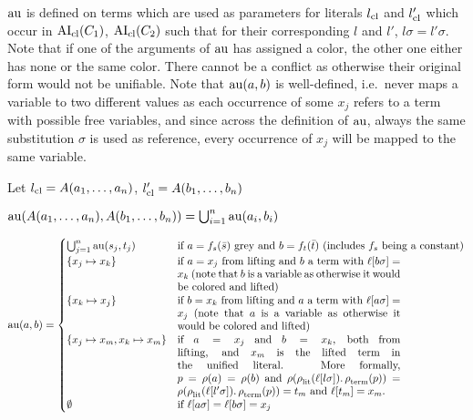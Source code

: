 \documentclass[,%
	paper=a4,%
	twoside=false,%
	liststotoc,
	bibtotoc,
	draft=false,%
	numbers=noendperiod
]{scrartcl}
\begin{document}
\begin{enumerate}
		$\operatorname{au}$ is defined on terms which are used as parameters for literals $l_\mathrm{cl}$ and $l_\mathrm{cl}'$
		which occur in $\operatorname{AI}_\mathrm{cl}(C_1)$, $\operatorname{AI}_\mathrm{cl}(C_2)$ such that for their corresponding $l$ and $l'$, $l\sigma = l'\sigma$.
		Note that if one of the arguments of $\operatorname{au}$ has assigned a color, the other one either has none or the same color.
		There cannot be a conflict as otherwise their original form would not be unifiable.
		Note that $\operatorname{au}(a, b)$ is well-defined, i.e.~never maps a variable to two different values as each occurrence of some $x_j$ refers to a term with possible free variables, and since across the definition of $\operatorname{au}$, always the same substitution $\sigma$ is used as reference, every occurrence of $x_j$ will be mapped to the same variable.

		Let 
		$l_\mathrm{cl} = A(a_1, \dotsc, a_n)$, $l_\mathrm{cl}' = A(b_1, \dotsc, b_n)$

		$\operatorname{au}(A(a_1, \dotsc, a_n), A(b_1, \dotsc, b_n)) = \bigcup_{i=1}^n \operatorname{au}(a_i, b_i)$

		$ \aiu (a, b) =
			\begin{cases}
				\bigcup_{j=1}^n \aiu(s_j, t_j) & \text{if $a=f_s(\bar s)$ grey and $b = f_t(\bar t)$ (includes $f_s$ being a constant)} \\
				\{x_j \mapsto x_k\} & \parbox[t]{.6\textwidth}{ if $a = x_j$ from lifting and $b$ a term with $\lifboth{b\sigma} = x_k$ (note that $b$ is a variable as otherwise it would be colored and lifted)} \\
			\{x_k \mapsto x_j\} & \parbox[t]{.6\textwidth}{  if $b = x_k$ from lifting and $a$ a term with $\lifboth{a\sigma} = x_j$ (note that $a$ is a variable as otherwise it would be colored and lifted)} \\
				\{x_j \mapsto x_m, x_k \mapsto x_m\} & \parbox[t]{.6\textwidth}{if $a = x_j$ and $b = x_k$, both from lifting, and $x_m$ is the lifted term in the unified literal. More formally, $p = \pos(a) = \pos(b)$ and $\pos(\poslit(\lifboth{l\sigma}).\posterm(p)) = \pos(\poslit(\lifboth{l'\sigma}).\posterm(p)) = t_m$ and $\lifboth{t_m} = x_m$.}\\
				\emptyset & \text{if $\lifboth{a\sigma} = \lifboth{b\sigma} = x_j$ }
			\end{cases} $


\end{enumerate}
\end{document}
